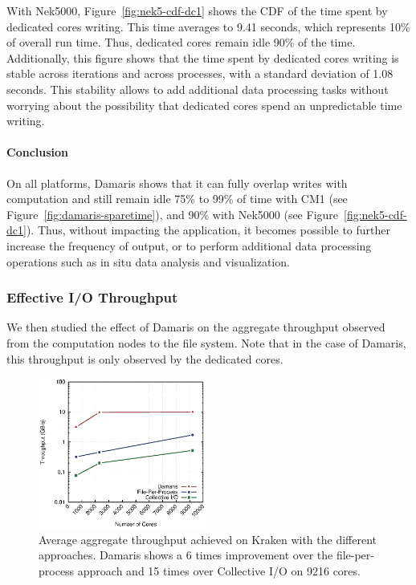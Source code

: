 With Nek5000, Figure~\ref{fig:nek5-cdf-dc1} shows the CDF of the time spent by dedicated cores writing. 
This time averages to 9.41 seconds, which represents 10\% of overall run time. Thus,
dedicated cores remain idle 90\% of the time. Additionally, this figure shows that the time
spent by dedicated cores writing is stable across iterations and across processes, with a standard deviation of 1.08 seconds.
This stability allows to add additional data processing tasks without worrying about the possibility that
dedicated cores spend an unpredictable time writing.

\paragraph{Conclusion} On all platforms, Damaris shows that it can fully overlap writes 
with computation and still remain idle 75\% to 99\% of time with CM1 (see Figure~\ref{fig:damaris-sparetime}),
and 90\% with Nek5000 (see Figure~\ref{fig:nek5-cdf-dc1}).
Thus, without impacting the application, it becomes possible to further increase the 
frequency of output, or to perform additional data processing operations such as in situ data analysis and visualization. 

\subsubsection{Effective I/O Throughput}\label{sec:throughput}

We then studied the effect of Damaris on the aggregate throughput observed from the computation nodes to
the file system. Note that in the case of Damaris, this throughput is only observed by the 
dedicated cores.

\begin{figure}
	\includegraphics[width=5.5cm]{figures/kraken-throughput.eps}
	\caption[Aggregate throughput of CM1 on Kraken]{Average aggregate 
	throughput achieved on Kraken with the different 
	approaches. Damaris shows a 6 times improvement over the file-per-process 
	approach and 15 times over Collective I/O on 9216 cores.}
	\label{fig:throughput-kraken}
\end{figure}

